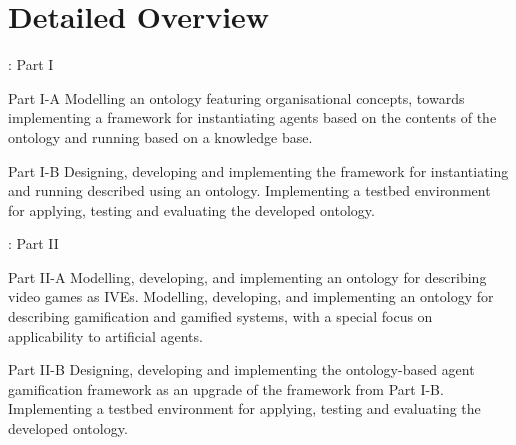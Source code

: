 \section{Detailed Overview}

\begin{frame}{\insertsection: Part \RN{1}}

    \onslide<+->
    \begin{exampleblock}{Part \RN{1}-A}
        Modelling an \alert{ontology} featuring organisational concepts, towards implementing a framework for \alert{instantiating agents} based on the contents of the ontology \alert{and running } based on a knowledge base.
    \end{exampleblock}

    \onslide<+->
    \begin{exampleblock}{Part \RN{1}-B}
        Designing, developing and implementing the \alert{framework for instantiating} and running  described using an ontology. Implementing a \alert{testbed environment} for applying, testing and evaluating the developed ontology.
    \end{exampleblock}
    
\end{frame}

\begin{frame}{\insertsection: Part \RN{2}}

    \onslide<+->
    \begin{exampleblock}{Part \RN{2}-A}
        Modelling, developing, and implementing \alert{an ontology for describing video games} as \acfp{IVE}. Modelling, developing, and implementing \alert{an ontology for describing gamification} and gamified systems, with a special focus on applicability to artificial agents.
    \end{exampleblock}

    \onslide<+->
    \begin{exampleblock}{Part \RN{2}-B}
        Designing, developing and implementing the ontology-based \alert{agent gamification framework} as an upgrade of the framework from Part \RN{1}-B. Implementing a \alert{testbed environment} for applying, testing and evaluating the developed ontology.
    \end{exampleblock}
    
\end{frame}